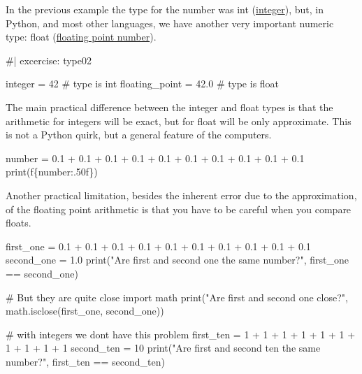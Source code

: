 \documentclass[
  letterpaper,
  DIV=11,
  numbers=noendperiod]{scrreprt}
\newenvironment{Shaded}{\begin{snugshade}}{\end{snugshade}}
\newcommand{\NormalTok}[1]{\textcolor[rgb]{0.00,0.23,0.31}{#1}}
\theoremstyle{remark}
\begin{document}
In the previous example the type for the number was int
(\href{https://en.wikipedia.org/wiki/Integer_(computer_science)}{integer}),
but, in Python, and most other languages, we have another very important
numeric type: float
(\href{https://en.wikipedia.org/wiki/Floating-point_arithmetic}{floating
point number}).

\begin{Shaded}
\begin{Highlighting}[]
\NormalTok{\#| excercise: type02}

\NormalTok{integer = 42  \# type is int}
\NormalTok{floating\_point = 42.0  \# type is float}
\end{Highlighting}
\end{Shaded}

The main practical difference between the integer and float types is
that the arithmetic for integers will be exact, but for float will be
only approximate. This is not a Python quirk, but a general feature of
the computers.

\begin{Shaded}
\begin{Highlighting}[]
\NormalTok{number = 0.1 + 0.1 + 0.1 + 0.1 + 0.1 + 0.1 + 0.1 + 0.1 + 0.1 + 0.1}
\NormalTok{print(f\textquotesingle{}\{number:.50f\}\textquotesingle{})}
\end{Highlighting}
\end{Shaded}

Another practical limitation, besides the inherent error due to the
approximation, of the floating point arithmetic is that you have to be
careful when you compare floats.

\begin{Shaded}
\begin{Highlighting}[]
\NormalTok{first\_one = 0.1 + 0.1 + 0.1 + 0.1 + 0.1 + 0.1 + 0.1 + 0.1 + 0.1 + 0.1}
\NormalTok{second\_one = 1.0}
\NormalTok{print("Are first and second one the same number?", first\_one == second\_one)}

\NormalTok{\# But they are quite close}
\NormalTok{import math}
\NormalTok{print("Are first and second one close?", math.isclose(first\_one, second\_one))}

\NormalTok{\# with integers we don\textquotesingle{}t have this problem}
\NormalTok{first\_ten = 1 + 1 + 1 + 1 + 1 + 1 + 1 + 1 + 1 + 1}
\NormalTok{second\_ten = 10}
\NormalTok{print("Are first and second ten the same number?", first\_ten == second\_ten)}
\end{Highlighting}
\end{Shaded}
\end{document}
